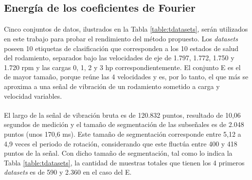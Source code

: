 \documentclass[a4paper,12pt]{article}
\begin{document}
\subsection{Energía de los coeficientes de Fourier}
\label{sec:energy}

\paragraph{}
Cinco conjuntos de datos, ilustrados en la Tabla \ref{table:tdatasets}, serán utilizados en este trabajo para probar el rendimiento del método propuesto. Los \textit{datasets} poseen 10 etiquetas de clasificación que corresponden a los 10 estados de salud del rodamiento, separados bajo las velocidades de eje de 1.797, 1.772, 1.750 y 1.720 rpm y las cargas 0, 1, 2 y 3 hp correspondientemente. El conjunto E es el de mayor tamaño, porque reúne las 4 velocidades y es, por lo tanto, el que más se aproxima a una señal de vibración de un rodamiento sometido a carga y velocidad variables.

\paragraph{}
El largo de la señal de vibración bruta es de 120.832 puntos, resultado de 10,06 segundos de medición y el tamaño de segmentación de las subseñales es de 2.048 puntos (unos 170,6 ms). Este tamaño de segmentación corresponde entre 5,12 a 4,9 veces el periodo de rotación, considerando que este fluctúa entre 400 y 418 puntos de la señal. Con dicho tamaño de segmentación, tal como lo indica la Tabla \ref{table:tdatasets}, la cantidad de muestras totales que tienen los 4 primeros \textit{datasets} es de 590 y 2.360 en el caso del E.

\begin{table}
\caption{Descripción de los 5 \textit{datasets}.}
\label{table:tdatasets}
\end{table}
\end{document}
